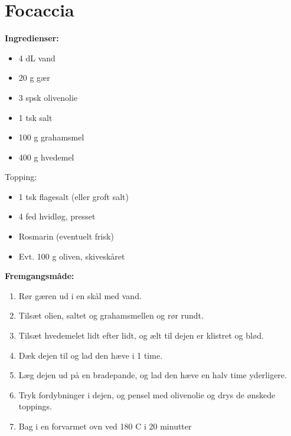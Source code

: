 \documentclass{book}
\begin{document}
\newpage \section{Focaccia}
\begin{minipage}[t]{0.5\textwidth}
\textbf{Ingredienser:}
\begin{itemize}
    \item 4 dL vand
    \item 20 g gær
    \item 3 spsk olivenolie
    \item 1 tsk salt
    \item 100 g grahamsmel
    \item 400 g hvedemel
\end{itemize}
Topping:
\begin{itemize}
    \item 1 tsk flagesalt (eller groft salt)
    \item 4 fed hvidløg, presset
    \item Rosmarin (eventuelt frisk)
    \item Evt. 100 g oliven, skiveskåret
    
\end{itemize}
\end{minipage}
\begin{minipage}[t]{0.5\textwidth}
\textbf{Fremgangsmåde:}
\begin{enumerate}
    \item Rør gæren ud i en skål med vand.
    \item Tilsæt olien, saltet og grahamsmellen og rør rundt.
    \item Tilsæt hvedemelet lidt efter lidt, og ælt til dejen er klistret og blød.
    \item Dæk dejen til og lad den hæve i 1 time.
    \item Læg dejen ud på en bradepande, og lad den hæve en halv time yderligere.
    \item Tryk fordybninger i dejen, og pensel med olivenolie og drys de ønskede toppings.
    \item Bag i en forvarmet ovn ved 180 \degree C i 20 minutter
\end{enumerate}
\end{minipage}
\end{document}
